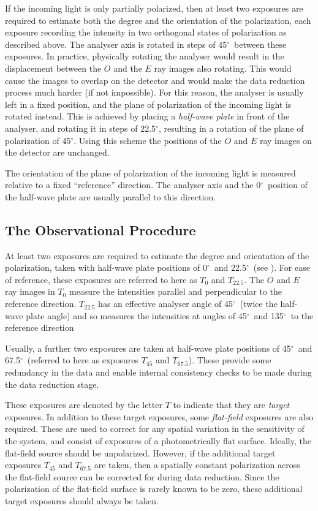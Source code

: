 \documentclass[twoside,11pt]{starlink}
\providecommand{\dgs}{\hbox{$^\circ$}}
\begin{document}
If the incoming light is only partially polarized, then at least two
exposures are required to estimate both the degree and the orientation of
the polarization, each exposure recording the intensity in two orthogonal
states of polarization as described above. The analyser axis is rotated
in steps of 45\dgs\ between these exposures. In practice, physically rotating
the analyser would result in the displacement between the $O$ and
the $E$ ray images also rotating. This would cause the images to overlap
on the detector and would make the data reduction process much harder (if
not impossible). For this reason, the analyser is usually left in a fixed
position, and the plane of polarization of the incoming light is rotated
instead. This is achieved by placing a \emph{half-wave plate} in
front of the analyser, and rotating it in steps of 22.5\dgs, resulting in
a rotation of the plane of polarization of 45\dgs. Using this scheme the
positions of the $O$ and $E$ ray images on the detector are unchanged.

The orientation of the plane of polarization of the incoming light is
measured relative to a fixed ``reference'' direction. The analyser axis
and the 0\dgs\ position of the half-wave plate are usually parallel to
this direction.

\subsection{\label{SEC:OBS}The Observational Procedure}
At least two exposures are required to estimate the degree and
orientation of the polarization, taken with half-wave plate positions of
0\dgs\ and 22.5\dgs\ (see ). For ease
of reference, these exposures are referred to here as $T_{0}$ and
$T_{22.5}$. The $O$ and $E$ ray images in $T_{0}$ measure the intensities
parallel and perpendicular to the reference direction. $T_{22.5}$ has an
effective analyser angle of 45\dgs\ (twice the half-wave plate angle) and
so measures the intensities at angles of 45\dgs\ and 135\dgs\ to the
reference direction

Usually, a further two exposures are taken at half-wave plate positions
of 45\dgs\ and 67.5\dgs\ (referred to here as exposures $T_{45}$ and
$T_{67.5}$). These provide some redundancy in the data and enable
internal consistency checks to be made during the data reduction stage.

These exposures are denoted by the letter $T$ to indicate that they are
\emph{target} exposures. In addition to these target exposures, some \emph{flat-field} exposures are also required. These are used to correct for
any spatial variation in the sensitivity of the system, and consist of
exposures of a photometrically flat surface. Ideally, the flat-field
source should be unpolarized. However, if the additional target exposures
$T_{45}$ and $T_{67.5}$ are taken, then a spatially constant polarization
across the flat-field source can be corrected for during data reduction.
Since the polarization of the flat-field surface is rarely known to be
zero, these additional target exposures should always be taken.
\end{document}
